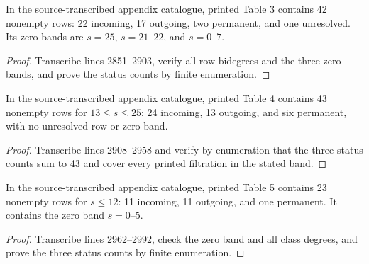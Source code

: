 \begin{proposition}
  \label{data:table-s123}
  \notready
  In the source-transcribed appendix catalogue, printed Table 3 contains 42 nonempty
  rows: 22 incoming, 17 outgoing, two permanent, and one unresolved.  Its zero
  bands are $s=25$, $s=21$--$22$, and $s=0$--$7$.
\end{proposition}

\begin{proof}
  Transcribe lines 2851--2903, verify all row bidegrees and the three zero
  bands, and prove the status counts by finite enumeration.
\end{proof}

\begin{proposition}
  \label{data:table-s124-high}
  \notready
  In the source-transcribed appendix catalogue, printed Table 4 contains 43 nonempty rows
  for $13\le s\le25$: 24 incoming, 13 outgoing, and six permanent, with no
  unresolved row or zero band.
\end{proposition}

\begin{proof}
  Transcribe lines 2908--2958 and verify by enumeration that the three status
  counts sum to 43 and cover every printed filtration in the stated band.
\end{proof}

\begin{proposition}
  \label{data:table-s124-low}
  \notready
  In the source-transcribed appendix catalogue, printed Table 5 contains 23 nonempty rows
  for $s\le12$: 11 incoming, 11 outgoing, and one permanent.  It contains the
  zero band $s=0$--$5$.
\end{proposition}

\begin{proof}
  Transcribe lines 2962--2992, check the zero band and all class degrees, and
  prove the three status counts by finite enumeration.
\end{proof}

